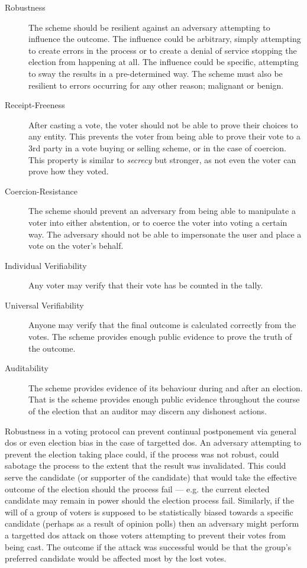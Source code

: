 \begin{description}
    \item[Robustness] The scheme should be resilient against an adversary attempting to influence the outcome. The influence could be arbitrary, simply attempting to create errors in the process or to create a denial of service stopping the election from happening at all. The influence could be specific, attempting to sway the results in a pre-determined way. The scheme must also be resilient to errors occurring for any other reason; malignant or benign.
    \item[Receipt-Freeness] After casting a vote, the voter should not be able to prove their choices to any entity. This prevents the voter from being able to prove their vote to a 3rd party in a vote buying or selling scheme, or in the case of coercion. This property is similar to \emph{secrecy} but stronger, as not even the voter can prove how they voted.
    \item[Coercion-Resistance] The scheme should prevent an adversary from being able to manipulate a voter into either abstention, or to coerce the voter into voting a certain way. The adversary should not be able to impersonate the user and place a vote on the voter's behalf.
    \item[Individual Verifiability] Any voter may verify that their vote has be counted in the tally.
    \item[Universal Verifiability] Anyone may verify that the final outcome is calculated correctly from the votes. The scheme provides enough public evidence to prove the truth of the outcome.
    \item[Auditability] The scheme provides evidence of its behaviour during and after an election. That is the scheme provides enough public evidence throughout the course of the election that an auditor may discern any dishonest actions.
\end{description}

Robustness in a voting protocol can prevent continual postponement via general \gls{dos} or even election bias in the case of targetted \gls{dos}. An adversary attempting to prevent the election taking place could, if the process was not robust, could sabotage the process to the extent that the result was invalidated. This could serve the candidate (or supporter of the candidate) that would take the effective outcome of the election should the process fail --- e.g. the current elected candidate may remain in power should the election process fail. Similarly, if the will of a group of voters is supposed to be statistically biased towards a specific candidate (perhaps as a result of opinion polls) then an adversary might perform a targetted \gls{dos} attack on those voters attempting to prevent their votes from being cast. The outcome if the attack was successful would be that the group's preferred candidate would be affected most by the lost votes.

